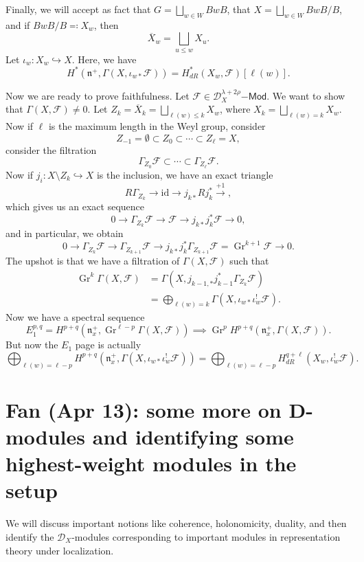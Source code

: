 \documentclass[leqno, openany]{memoir}
\theoremstyle{definition}
\theoremstyle{remark}
\theoremstyle{plain}
\theoremstyle{definition}
\theoremstyle{remark}
\newcommand{\mc}[1]{\mathcal{#1}}
\newcommand{\mf}[1]{\mathfrak{#1}}
\newcommand{\mr}[1]{\mathrm{#1}}
\newcommand{\on}[1]{\operatorname{#1}}
\newcommand{\ms}[1]{\mathsf{#1}}
\newcommand{\ol}[1]{\overline{#1}}
\begin{document}
Finally, we will accept as fact that $G = \bigsqcup_{w \in W} B w B$, that $X = \bigsqcup_{w \in W} B w B / B$, and if $B w B / B \eqqcolon X_w$, then
\[ \ol{X}_w = \bigsqcup_{u \leq w} X_u. \]
Let $\iota_w \colon X_w \hookrightarrow X$. Here, we have
\[ H^*(\mf{n}^+, \Gamma(X, \iota_{w*} \mc{F})) = H^*_{dR}(X_w, \mc{F})[\ell(w)]. \]

Now we are ready to prove faithfulness. Let $\mc{F} \in \mc{D}_X^{\lambda + 2\rho}\ms{-Mod}$. We want to show that $\Gamma(X, \mc{F}) \neq 0$. Let $Z_k = \ol{X}_k = \bigsqcup_{\ell(w) \leq k} X_w$, where $X_k = \bigsqcup_{\ell(w) = k} X_w$. Now if $\ell$ is the maximum length in the Weyl group, consider
\[ Z_{-1} = \emptyset \subset Z_0 \subset \cdots \subset Z_{\ell} = X, \]
consider the filtration
\[ \Gamma_{Z_0} \mc{F} \subset \cdots \subset \Gamma_{Z_{\ell}} \mc{F}. \]
Now if $j_i \colon X \setminus Z_k \hookrightarrow X$ is the inclusion, we have an exact triangle
\[ R \Gamma_{Z_k} \to \mr{id} \to j_{k*} R j_k^* \xrightarrow{+1}, \]
which gives us an exact sequence
\[ 0 \to \Gamma_{Z_k} \mc{F} \to \mc{F} \to j_{k*} j_k^* \mc{F} \to 0, \]
and in particular, we obtain
\[ 0 \to \Gamma_{Z_k} \mc{F} \to \Gamma_{Z_{k+1}} \mc{F} \to j_{k*} j_k^* \Gamma_{Z_{k+1}} \mc{F} = \on{Gr}^{k+1} \mc{F} \to 0. \]
The upshot is that we have a filtration of $\Gamma(X, \mc{F})$ such that
\begin{align*}
    \on{Gr}^k \Gamma(X, \mc{F}) &= \Gamma(X, j_{k-1,*} j_{k-1}^* \Gamma_{Z_k} \mc{F}) \\
    &= \bigoplus_{\ell(w) = k} \Gamma(X, \iota_{w*} \iota_w^! \mc{F}).
\end{align*}
Now we have a spectral sequence
\[ E_1^{p,q} = H^{p+q}(\mf{n}_x^+, \on{Gr}^{\ell-p} \Gamma(X, \mc{F})) \implies \on{Gr}^p H^{p+q}(\mf{n}_x^+, \Gamma(X, \mc{F})). \]
But now the $E_1$ page is actually
\[ \bigoplus_{\ell(w) = \ell-p} H^{p+q}(\mf{n}_x^+, \Gamma(X, \iota_{w*} \iota_w^! \mc{F})) = \bigoplus_{\ell(w) = \ell-p} H_{dR}^{q+\ell} (X_w, \iota_w^! \mc{F}). \]

\chapter{Fan (Apr 13): some more on D-modules and identifying some highest-weight modules in the setup}%

We will discuss important notions like coherence, holonomicity, duality, and then identify the $\mc{D}_X$-modules corresponding to important modules in representation theory under localization.
\end{document}
